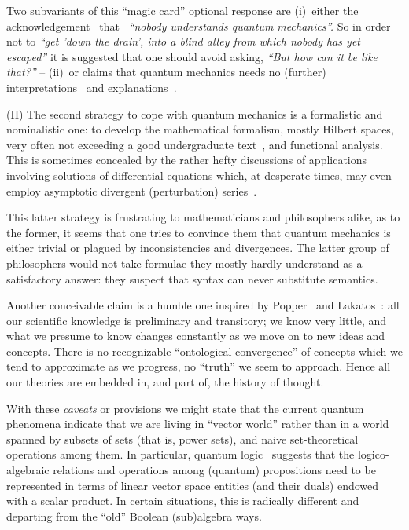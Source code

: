 Two subvariants of this ``magic card'' optional response are
(i)~either the acknowledgement~\cite{mermin-1989-shutup,mermin-2004-shutup} that~\cite[Chapter~6]{feynman-law}
{\em ``nobody understands quantum mechanics''.}
So in order not to
{\em ``get 'down the drain', into a blind alley from which nobody has
yet escaped''}  it is suggested that
one should avoid asking, {\em ``But how can it be like that?''}
--
(ii)~or claims that quantum mechanics needs no (further) interpretations~\cite{fuchs-peres} and explanations~\cite{Englert2013}.

(II) The second strategy to cope with quantum mechanics is a formalistic and nominalistic one:
to develop the mathematical formalism, mostly Hilbert spaces,
very often not exceeding a good undergraduate text~\cite{halmos-vs}, and functional analysis.
This is sometimes concealed by the rather hefty discussions of applications involving
solutions of differential equations which, at desperate times,
may even employ asymptotic divergent (perturbation) series~\cite{PhysRev.85.631,LeGuillou-Zinn-Justin,PhysRevD.57.1144}.

This latter strategy is frustrating to mathematicians and philosophers alike,
as to the former, it seems that one tries to convince them
that quantum mechanics is either trivial or plagued by inconsistencies and divergences.
The latter group of philosophers would not take formulae they mostly hardly understand as a satisfactory answer:
they suspect that syntax can never substitute semantics.

Another conceivable claim is a humble one inspired by Popper~\cite{popper} and Lakatos~\cite{lakatosch}:
all our scientific knowledge is preliminary and transitory; we know very little, and what we presume to know changes constantly
as we move on to new ideas and concepts. There is no recognizable ``ontological convergence'' of concepts
which we tend to approximate as we
progress, no ``truth'' we seem to approach. Hence all our theories are embedded in, and part of, the history of thought.

With these {\it caveats} or provisions we might state that the current quantum phenomena indicate that we are living
in ``vector world'' rather than in a world spanned by subsets of sets (that is, power sets), and naive set-theoretical operations among them.
In particular, quantum logic~\cite{birkhoff-36} suggests that the logico-algebraic relations and operations among (quantum) propositions
need to be represented in terms of linear vector space entities (and their duals) endowed with a scalar product.
In certain situations, this is radically different and departing from the ``old'' Boolean (sub)algebra ways.

